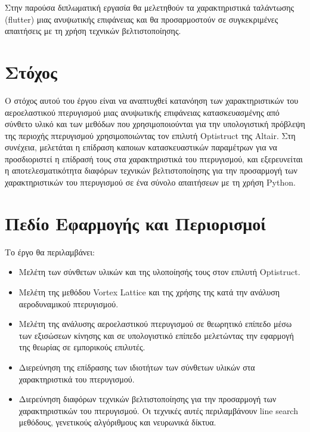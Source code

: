 Στην παρούσα διπλωματική εργασία θα μελετηθούν τα χαρακτηριστικά ταλάντωσης (\textlatin{flutter}) μιας ανυψωτικής επιφάνειας και θα προσαρμοστούν σε συγκεκριμένες απαιτήσεις με τη χρήση τεχνικών βελτιστοποίησης.


\section{Στόχος}\label{objective}

Ο στόχος αυτού του έργου είναι να αναπτυχθεί κατανόηση των χαρακτηριστικών του αεροελαστικού πτερυγισμού μιας ανυψωτικής επιφάνειας κατασκευασμένης από σύνθετο υλικό και των μεθόδων που χρησιμοποιούνται για την υπολογιστική πρόβλεψη της περιοχής πτερυγισμού χρησιμοποιώντας τον επιλυτή \textlatin{Optistruct} της \textlatin{Altair}. Στη συνέχεια, μελετάται η επίδραση καποιων κατασκευαστικών παραμέτρων για να προσδιοριστεί η επίδρασή τους στα χαρακτηριστικά του πτερυγισμού, και εξερευνείται η αποτελεσματικότητα διαφόρων τεχνικών βελτιστοποίησης για την προσαρμογή των χαρακτηριστικών του πτερυγισμού σε ένα σύνολο απαιτήσεων με τη χρήση \textlatin{Python}.

\section{Πεδίο Εφαρμογής και Περιορισμοί}\label{scope-and-limitations}

Το έργο θα περιλαμβάνει:

\begin{itemize} 
  \item Μελέτη των σύνθετων υλικών και της υλοποίησής τους στον επιλυτή \textlatin{Optistruct}.
  \item Μελέτη της μεθόδου \textlatin{Vortex Lattice} και της χρήσης της κατά την ανάλυση αεροδυναμικού πτερυγισμού. 
  \item Μελέτη της ανάλυσης αεροελαστικού πτερυγισμού σε θεωρητικό επίπεδο μέσω των εξισώσεων κίνησης και σε υπολογιστικό επίπεδο μελετώντας την εφαρμογή της θεωρίας σε εμπορικούς επιλυτές. 
  \item Διερεύνηση της επίδρασης των ιδιοτήτων των σύνθετων υλικών στα χαρακτηριστικά του πτερυγισμού. 
  \item Διερεύνηση διαφόρων τεχνικών βελτιστοποίησης για την προσαρμογή των χαρακτηριστικών του πτερυγισμού. Οι τεχνικές αυτές περιλαμβάνουν \textlatin{line search} μεθόδους, γενετικούς αλγόριθμους και νευρωνικά δίκτυα. 
\end{itemize}

